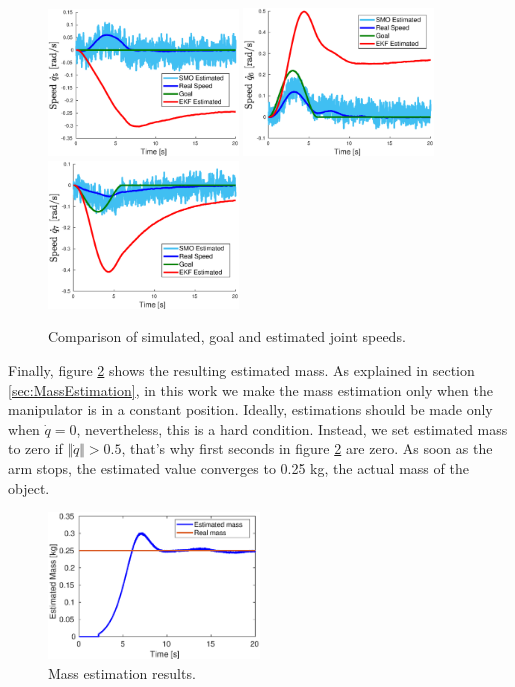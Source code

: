\documentclass[a4paper, 10pt]{article}
\begin{document}
\begin{figure}
  \includegraphics[width=0.45\textwidth]{Figures/result_qp5.eps}
  \includegraphics[width=0.45\textwidth]{Figures/result_qp6.eps}
  \includegraphics[width=0.45\textwidth]{Figures/result_qp7.eps}
  \caption{Comparison of simulated, goal and estimated joint speeds.}
  \label{fig:result_qp}
\end{figure}

Finally, figure \ref{fig:MassEstimation} shows the resulting estimated mass. As explained in section \ref{sec:MassEstimation}, in this work we make the mass estimation only when the manipulator is in a constant position. Ideally, estimations should be made only when $\dot{q}=0$, nevertheless, this is a hard condition. Instead, we set estimated mass to zero if $\Vert\dot{q}\Vert > 0.5$, that's why first seconds in figure \ref{fig:MassEstimation} are zero. As soon as the arm stops, the estimated value converges to 0.25 kg, the actual mass of the object. 
\begin{figure}
  \centering
  \includegraphics[width=0.5\textwidth]{Figures/result_mass.eps}
  \caption{Mass estimation results.}
  \label{fig:MassEstimation}
\end{figure}
\end{document}
